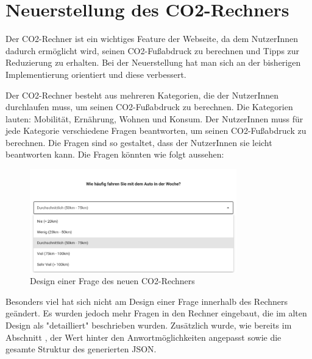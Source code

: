 \section{Neuerstellung des CO2-Rechners}


Der CO2-Rechner ist ein wichtiges Feature der Webseite, da dem NutzerInnen dadurch ermöglicht wird, seinen CO2-Fußabdruck zu berechnen und Tipps zur Reduzierung zu erhalten.
Bei der Neuerstellung hat man sich an der bisherigen Implementierung orientiert und diese verbessert.

Der CO2-Rechner besteht aus mehreren Kategorien, die der NutzerInnen durchlaufen muss, um seinen CO2-Fußabdruck zu berechnen.
Die Kategorien lauten: Mobilität, Ernährung, Wohnen und Konsum.
Der NutzerInnen muss für jede Kategorie verschiedene Fragen beantworten, um seinen CO2-Fußabdruck zu berechnen.
Die Fragen sind so gestaltet, dass der NutzerInnen sie leicht beantworten kann.
Die Fragen könnten wie folgt aussehen:

\begin{figure}[H]
    \centering
    \includegraphics[width=0.8\textwidth]{images/06/Question_New_Design.png}
    \caption{Design einer Frage des neuen CO2-Rechners}
    \label{fig:new-co2runter-question-design}
\end{figure}

Besonders viel hat sich nicht am Design einer Frage innerhalb des Rechners geändert.
Es wurden jedoch mehr Fragen in den Rechner eingebaut, die im alten Design als "detailliert" beschrieben wurden.
Zusätzlich wurde, wie bereits im Abschnitt
, der Wert hinter den Anwortmöglichkeiten angepasst sowie die gesamte Struktur des generierten \acs{JSON}.

